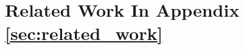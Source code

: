 \documentclass{article} %
\begin{document}






% 
\section{Related Work In Appendix \ref{sec:related_work}}





\newpage






\newpage
\appendix

\end{document}
